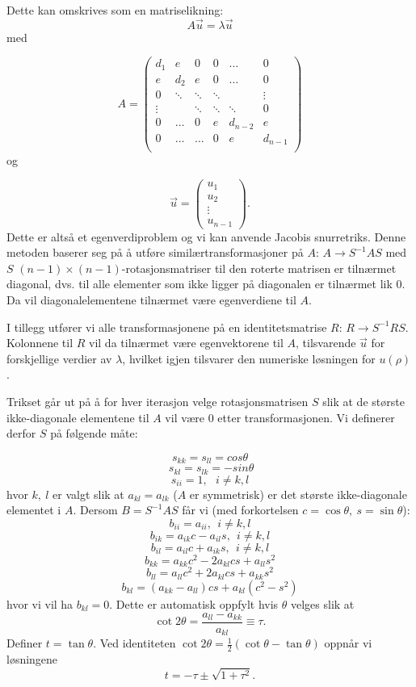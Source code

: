 \documentclass[norsk, 12pt]{article}
\newcommand{\f}{\frac}
\begin{document}
Dette kan omskrives som en matriselikning:
$$A \vec u = \lambda \vec u$$
med

$$ A = \left(\begin{matrix}
 d_1 & e & 0 & 0 & \dots & 0 \\
 e & d_2 & e & 0 & \dots & 0 \\
 0 & \ddots & \ddots & \ddots &  & \vdots \\
 \vdots & & \ddots & \ddots & \ddots & 0 \\
 0 & \dots & 0 & e & d_{n-2} & e\\
 0 & \dots & \dots & 0 & e & d_{n-1} \\
\end{matrix}\right)$$ 
og 

$$ \vec u  = \left(\begin{matrix} u_1 \\ u_2 \\ \vdots \\u_{n-1} \end{matrix}\right).$$
Dette er altså et egenverdiproblem og vi kan anvende Jacobis snurretriks.
Denne metoden baserer seg på å utføre similærtransformasjoner på $A$: $A \rightarrow S^{-1}AS$ med $S$ 
$(n-1)\times(n-1)$-rotasjonsmatriser til den roterte matrisen er tilnærmet diagonal, dvs. til alle elementer som 
ikke ligger på diagonalen er tilnærmet lik 0. Da vil diagonalelementene tilnærmet være egenverdiene til $A$.

I tillegg utfører vi alle transformasjonene på en identitetsmatrise $R$: $R \rightarrow S^{-1}RS$. Kolonnene til $R$ vil da
tilnærmet være egenvektorene til $A$, tilsvarende $\vec u$ for forskjellige verdier av $\lambda$, hvilket igjen 
tilsvarer den numeriske løsningen for $u(\rho)$.

Trikset går ut på å for hver iterasjon velge rotasjonsmatrisen $S$ slik at de største ikke-diagonale elementene til $A$
vil være 0 etter transformasjonen. Vi definerer derfor $S$ på følgende måte:

$$s_{kk} = s_{ll} = cos\theta$$
$$\ s_{kl} = s_{lk} = -sin\theta$$
$$s_{ii} = 1,\ \ \ i\neq k,l$$
hvor $k,\ l$ er valgt slik at $a_{kl}=a_{lk}$ ($A$ er symmetrisk) er det største ikke-diagonale elementet i $A$.
Dersom $B = S^{-1}AS$ får vi (med forkortelsen $c=\cos\theta,\ s=\sin\theta$):
$$b_{ii} = a_{ii},\ \ i\neq k,l$$
$$b_{ik} = a_{ik}c - a_{il}s,\ \ i\neq k,l$$
$$b_{il} = a_{il}c + a_{ik}s,\ \ i\neq k,l$$
$$b_{kk} = a_{kk}c^2-2a_{kl}cs+a_{ll}s^2$$
$$b_{ll} = a_{ll} c^2 +2a_{kl}cs + a_{kk}s^2$$
$$b_{kl} = (a_{kk}-a_{ll})cs+a_{kl}(c^2-s^2)$$
hvor vi  vil ha $b_{kl}=0$. Dette er automatisk oppfylt hvis $\theta$ velges slik at
$$\cot2\theta = \f{a_{ll}-a_{kk}}{a_{kl}}\equiv \tau.$$
Definer $t = \tan\theta$. Ved identiteten $\cot2\theta = \f{1}{2}(\cot\theta-\tan\theta)$ oppnår vi løsningene
$$t = -\tau\pm\sqrt{1+\tau^2}.$$
\end{document}
